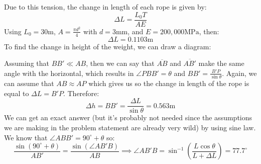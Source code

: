 \documentclass{article}
\begin{document}
Due to this tension, the change in length of each rope is given by:
\begin{equation}
    \Delta L = \frac{L_0T}{AE}
    \label{eq:change in length}
\end{equation}
Using $L_0=30\si{\meter}$, $A=\frac{\pi d^2}{4}$ with $d=3\si{\milli\meter}$, and $E=200,000\si{\mega\pascal}$, then:
\begin{equation}
    \boxed{\Delta L = 0.1103\si{\meter}}
    \label{eq:}
\end{equation}
To find the change in height of the weight, we can draw a diagram:
\begin{center}
\end{center}
Assuming that $BB' \ll AB$, then we can say that $\overline{AB}$ and $\overline{AB'}$ make the same angle with the horizontal, which results in $\angle PBB'=\theta$ and $\displaystyle BB'=\frac{B'P}{\sin\theta}$. Again, we can assume that $AB\approx AP$ which gives us so the change in length of the rope is equal to $\Delta L=B'P$. Therefore:
\begin{equation}
    \Delta h = BB'=\frac{\Delta L}{\sin\theta}=0.563\si{\meter}
    \label{eq:}
\end{equation}
We can get an exact answer (but it's probably not needed since the assumptions we are making in the problem statement are already very wild) by using sine law. We know that $\angle ABB' = 90^\circ+\theta$ so:
\begin{equation}
    \frac{\sin(90^\circ+\theta)}{AB'}=\frac{\sin(\angle AB'B)}{AB}
    \implies \angle AB'B = \sin^{-1}\left(\frac{L \cos\theta}{L+\Delta L}\right) = 77.7^\circ
    \label{eq:}
\end{equation}
\end{document}
